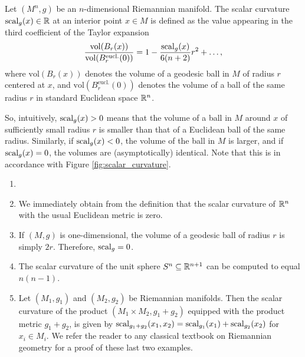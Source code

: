 \begin{definition}
    Let $(M^n,g)$ be an $n$-dimensional Riemannian manifold. The scalar curvature $\mathrm{scal}_g(x) \in \mathbb{R}$ at an interior point $x \in M$ is defined as the value appearing in the third coefficient of the Taylor expansion
    \begin{equation*}
    \frac{\mathrm{vol}(B_r(x))}{\mathrm{vol}(B_r^{\text{eucl.}}(0))} = 1 - \frac{\mathrm{scal}_g(x)}{6(n+2)}r^2 + \dots,
    \end{equation*}
    where $\mathrm{vol}(B_r(x))$ denotes the volume of a geodesic ball in $M$ of radius $r$ centered at $x$, and $\mathrm{vol}(B_r^{\text{eucl.}}(0))$ denotes the volume of a ball of the same radius $r$ in standard Euclidean space $\mathbb{R}^n$.
\end{definition}

So, intuitively, $\mathrm{scal}_g(x) > 0$ means that the volume of a ball in $M$ around $x$ of sufficiently small radius $r$ is smaller than that of a Euclidean ball of the same radius. Similarly, if $\mathrm{scal}_g(x) < 0$, the volume of the ball in $M$ is larger, and if $\mathrm{scal}_g(x) = 0$, the volumes are (asymptotically) identical. Note that this is in accordance with Figure \ref{fig:scalar_curvature}. 

\begin{example}
    \begin{enumerate}[label=(\roman*)]
        \label{psc:ex:scalar_curvature_examples}
        \item[]
        \item \vspace{-.5em} We immediately obtain from the definition that the scalar curvature of $\mathbb{R}^n$ with the usual Euclidean metric is zero.
        \item \label{psc:ex:scalar_curvature_examples2} If $(M,g)$ is one-dimensional, the volume of a geodesic ball of radius $r$ is simply $2r$. Therefore, $\mathrm{scal}_g = 0$.
        \item \label{psc:ex:scalar_curvature_examples3} The scalar curvature of the unit sphere $S^n \subseteq \mathbb{R}^{n+1}$ can be computed to equal $n(n-1)$.
        \item \label{psc:ex:scalar_curvature_examples4} Let $(M_1,g_1)$ and $(M_2,g_2)$ be Riemannian manifolds. Then the scalar curvature of the product $(M_1 \times M_2, g_1 + g_2)$ equipped with the product metric $g_1 + g_2$, is given by $\mathrm{scal}_{g_1 + g_2}(x_1,x_2) = \mathrm{scal}_{g_1}(x_1) + \mathrm{scal}_{g_2}(x_2)$ for $x_i \in M_i$. We refer the reader to any classical textbook on Riemannian geometry for a proof of these last two examples.
    \end{enumerate}
\end{example}


